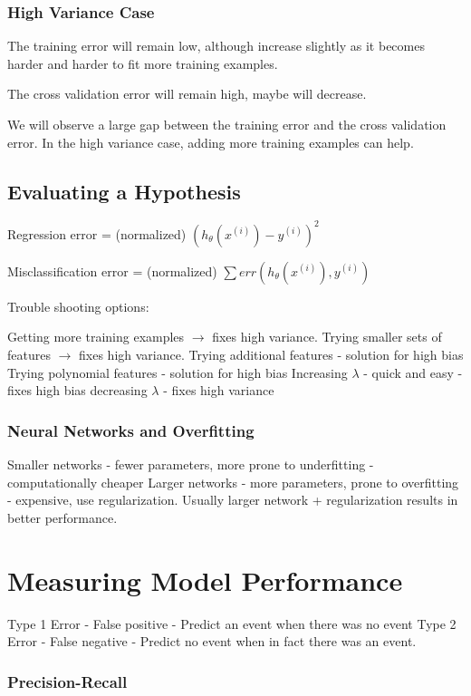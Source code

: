\subsubsection{High Variance Case}

The training error will remain low, although increase slightly as it becomes harder and harder to fit more training examples.

The cross validation error will remain high, maybe will decrease.

We will observe a large gap between the training error and the cross validation error. In the high variance case, adding more training examples can help.

\subsection{Evaluating a Hypothesis}

Regression error = (normalized) $(h_\theta(x^(i)) - y^{(i)})^2$

Misclassification error = (normalized) $\sum err (h_\theta(x^{(i)}), y^{(i)})$

Trouble shooting options:

Getting more training examples $\rightarrow$ fixes high variance.
Trying smaller sets of features $\rightarrow$ fixes high variance.
Trying additional features - solution for high bias
Trying polynomial features - solution for high bias
Increasing $\lambda$ - quick and easy - fixes high bias
decreasing $\lambda$ - fixes high variance

\subsubsection{Neural Networks and Overfitting}

Smaller networks - fewer parameters, more prone to underfitting - computationally cheaper
Larger networks - more parameters, prone to overfitting - expensive, use regularization. 
Usually larger network + regularization results in better performance.


\section{Measuring Model Performance}

Type 1 Error - False positive - Predict an event when there was no event
Type 2 Error - False negative - Predict no event when in fact there was an event.

\subsubsection{Precision-Recall}

